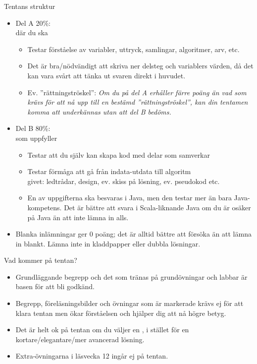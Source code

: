 \begin{Slide}{Tentans struktur}
\begin{itemize}\SlideFontSmall
\item Del A 20\%:\\ där du ska 
\begin{itemize}\SlideFontTiny
\item Testar förståelse av variabler, uttryck, samlingar, algoritmer, arv, etc.
\item Det är bra/nödvändigt att skriva ner delsteg och variablers värden, då det kan vara svårt att tänka ut svaren direkt i huvudet.
\item Ev. ''rättningströskel'': \textit{Om du på del A erhåller färre poäng än vad som krävs för att nå upp till en bestämd ''rättningströskel'', kan din tentamen komma att underkännas utan att del B bedöms.}
\end{itemize}


\item Del B 80\%:\\ som uppfyller 
\begin{itemize}\SlideFontTiny
\item Testar att du själv kan skapa kod med delar som samverkar
\item Testar förmåga att gå från indata-utdata till algoritm \\
 givet: ledtrådar, design, ev. skiss på lösning, ev. pseudokod etc.
\item En av uppgifterna ska besvaras i Java, men den testar mer än bara Java-kompetens. Det är bättre att svara i Scala-liknande Java om du är osäker på Java än att inte lämna in alls.
\end{itemize}
\item Blanka inlämningar ger 0 poäng; det är alltid bättre att försöka än att lämna in blankt. Lämna inte in kladdpapper eller dubbla lösningar.
\end{itemize}
\end{Slide}


\begin{Slide}{Vad kommer på tentan?}
\begin{itemize}
\item Grundläggande begrepp och det som tränas på grundövningar och labbar är basen för att bli godkänd.
\item Begrepp, föreläsningsbilder och övningar som är markerade  krävs ej för att klara tentan men ökar förståelsen och hjälper dig att nå högre betyg.
\item Det är helt ok på tentan om du väljer en  , i stället för en kortare/elegantare/mer avancerad lösning.
\item Extra-övningarna i läsvecka 12 ingår ej på tentan.
\end{itemize}
\end{Slide}



